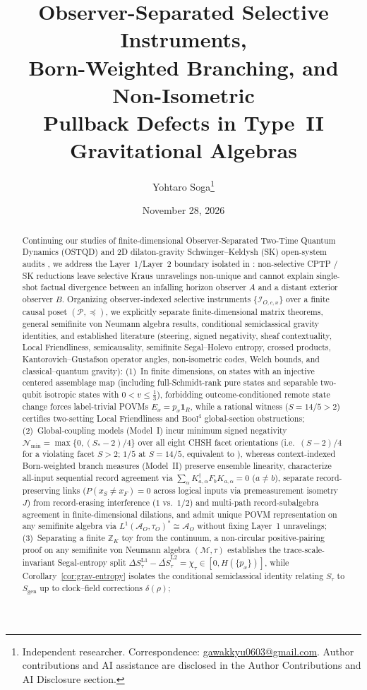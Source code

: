 \documentclass[11pt,a4paper]{article}
\title{\textbf{Observer-Separated Selective Instruments,\\
Born-Weighted Branching, and Non-Isometric\\
Pullback Defects in Type~II Gravitational Algebras}}
\author{Yohtaro Soga\thanks{Independent researcher. Correspondence: \href{mailto:gawakkyu0603@gmail.com}{gawakkyu0603@gmail.com}. Author contributions and AI assistance are disclosed in the Author Contributions and AI Disclosure section.}}
\date{November 28, 2026}
\theoremstyle{definition}
\theoremstyle{remark}
\newcommand{\cA}{\mathcal{A}}
\newcommand{\cI}{\mathcal{I}}
\newcommand{\cM}{\mathcal{M}}
\newcommand{\cN}{\mathcal{N}}
\newcommand{\cP}{\mathcal{P}}
\newcommand{\bbZ}{\mathbb{Z}}
\newcommand{\1}{\mathbf{1}}
\begin{document}
\maketitle
\vspace{-1.2em}
\begin{abstract}\small
Continuing our studies of finite-dimensional Observer-Separated Two-Time Quantum Dynamics (OSTQD) \cite{Soga2026OSTQD} and 2D dilaton-gravity Schwinger--Keldysh (SK) open-system audits \cite{Soga2026OSTQDSK}, we address the Layer~1/Layer~2 boundary isolated in \cite{Soga2026OSTQDSK}: non-selective CPTP / SK reductions leave selective Kraus unravelings non-unique and cannot explain single-shot factual divergence between an infalling horizon observer $A$ and a distant exterior observer $B$. Organizing observer-indexed selective instruments $\{\cI_{O,c,x}\}$ over a finite causal poset $(\cP,\preceq)$, we explicitly separate finite-dimensional matrix theorems, general semifinite von Neumann algebra results, conditional semiclassical gravity identities, and established literature (steering, signed negativity, sheaf contextuality, Local Friendliness, semicausality, semifinite Segal--Holevo entropy, crossed products, Kantorovich--Gustafson operator angles, non-isometric codes, Welch bounds, and classical--quantum gravity):
(1)~In finite dimensions, on states with an injective centered assemblage map (including full-Schmidt-rank pure states and separable two-qubit isotropic states with $0<v\le\frac{1}{3}$), forbidding outcome-conditioned remote state change forces label-trivial POVMs $E_x=p_x\1_R$, while a rational witness ($S=14/5>2$) certifies two-setting Local Friendliness and $\mathrm{Bool}^4$ global-section obstructions;
(2)~Global-coupling models (Model~I) incur minimum signed negativity $\cN_{\min}=\max\{0,(S_*-2)/4\}$ over all eight CHSH facet orientations (i.e.\ $(S-2)/4$ for a violating facet $S>2$; $1/5$ at $S=14/5$, equivalent to \cite{Oas2014}), whereas context-indexed Born-weighted branch measures (Model~II) preserve ensemble linearity, characterize all-input sequential record agreement via $\sum_\alpha K_{a,\alpha}^\dagger F_b K_{a,\alpha}=0$ ($a\neq b$), separate record-preserving links ($P(x_S\neq x_F)=0$ across logical inputs via premeasurement isometry $J$) from record-erasing interference ($1$ vs.\ $1/2$) and multi-path record-subalgebra agreement in finite-dimensional dilations, and admit unique POVM representation on any semifinite algebra via $L^1(\cA_O,\tau_O)^*\cong\cA_O$ without fixing Layer~1 unravelings;
(3)~Separating a finite $\bbZ_K$ toy from the continuum, a non-circular positive-pairing proof on any semifinite von Neumann algebra $(\cM,\tau)$ establishes the trace-scale-invariant Segal-entropy split $\Delta S_\tau^{\mathrm{L1}}-\overline{\Delta S}_\tau^{\mathrm{L2}}=\chi_\tau\in[0,H(\{p_x\})]$, while Corollary~\ref{cor:grav-entropy} isolates the conditional semiclassical identity relating $S_\tau$ to $S_{\mathrm{gen}}$ up to clock--field corrections $\delta(\rho)$;

\end{abstract}
\end{document}
